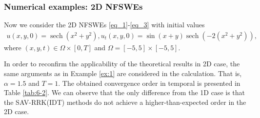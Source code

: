 \documentclass[aspectratio=169]{beamer}
\begin{document}
	\begin{frame}\frametitle{Numerical examples: 2D NFSWEs}
	\begin{example}\label{ex:2}
	  Now we consider the 2D NFSWEs \eqref{eq_1}-\eqref{eq_3} with initial values
	  \begin{align*}
		  u(x, y, 0)=\operatorname{sech}\left(x^2+y^2\right), u_t(x, y, 0)=\sin (x+y) \operatorname{sech}\left(-2\left(x^2+y^2\right)\right),
	  \end{align*}
	  where $(x, y, t) \in \Omega \times[0, T]$ and $\Omega=[-5,5] \times[-5,5]$.
	  \end{example}
	
	In order to reconfirm the applicability of the theoretical results in 2D case,
	  the same arguments as in Example \ref{ex:1} are considered in the calculation.
	  That is, $\alpha=1.5$ and $T=1$.  The obtained convergence order in temporal is presented in Table \ref{tab:6-2}. We can observe that the only difference
	  from the 1D case is that the SAV-RRK(IDT) methods do not achieve a higher-than-expected
	  order in the 2D case.
	\end{frame}
	
\end{document}
